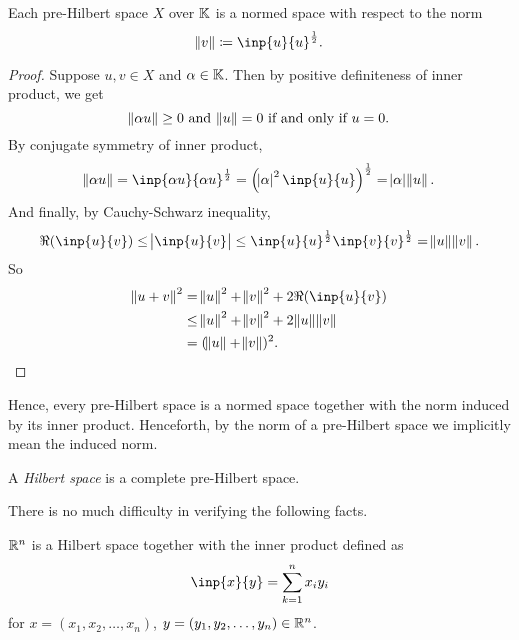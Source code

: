 \begin{thm}
Each pre-Hilbert space $X$ over $\mathbb{K}$ is a normed space with respect to 
the norm 
\begin{equation}
    \norm{v} \coloneqq \inp{u}{u} ^\frac{1}{2}.
\end{equation}
\end{thm}
\begin{proof}
Suppose $u, v \in X$ and $\alpha \in \mathbb{K}$. Then by positive definiteness 
of inner product, we get 
\begin{equation}
    \norm{\alpha u} \ge 0 \text{ and } \norm{u} = 0 \text{ if and only if }
    u = 0.
\end{equation}
By conjugate symmetry of inner product, 
\begin{equation}
    \norm{\alpha u} = \inp{\alpha u}{\alpha u} ^\frac{1}{2}
    = \left( \abs{\alpha}^2 \inp{u}{u} \right) ^\frac{1}{2}
    = \abs{\alpha}\norm{u}.
\end{equation}
And finally, by Cauchy-Schwarz inequality, 
\begin{equation}
    \Re(\inp{u}{v}) \le \abs{\inp{u}{v}} \le 
    \inp{u}{u} ^\frac{1}{2} \inp{v}{v} ^\frac{1}{2} = \norm{u}\norm{v}.
\end{equation}
So
\begin{equation}
    \begin{aligned}
        \norm{u+v}^2 &= \norm{u}^2 + \norm{v}^2 + 2\Re(\inp{u}{v}) \\
        &\le \norm{u}^2 + \norm{v}^2 + 2\norm{u}\norm{v} \\
        &= (\norm{u} + \norm{v})^2.
    \end{aligned}
\end{equation}
\end{proof}

Hence, every pre-Hilbert space is a normed space together with the norm 
induced by its inner product. 
Henceforth, by the norm of a pre-Hilbert space we implicitly mean the 
induced norm. 

\begin{defn}
A \emph{Hilbert space} is a complete pre-Hilbert space. 
\end{defn}

There is no much difficulty in verifying the following facts. 
\begin{example}
$\mathbb{R}^n$ is a Hilbert space together with the inner product defined as 
\begin{equation*}
    \inp{x}{y} = \sum_{k=1}^{n} x_i y_i 
\end{equation*}
for $x = \left(x_1, x_2, \ldots, x_n \right)$, $y = \left(y_1, y_2, \ldots, 
y_n \right) \in \mathbb{R}^n$. 
\end{example}

